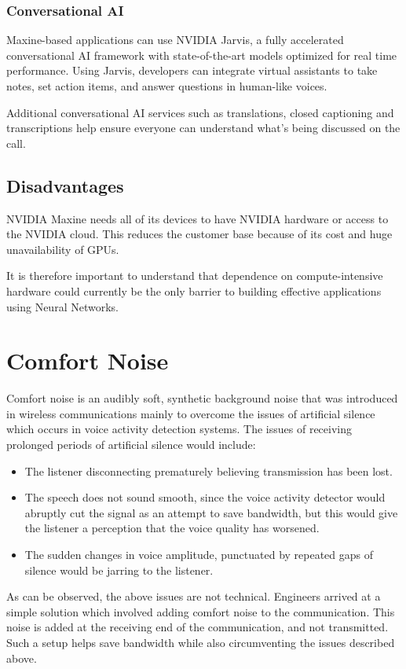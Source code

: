 \subsubsection{Conversational AI}
Maxine-based applications can use NVIDIA Jarvis, a fully accelerated conversational
AI framework with state-of-the-art models optimized for real time performance. Using Jarvis, 
developers can integrate virtual assistants to take notes, set action items, and answer questions 
in human-like voices.

Additional conversational AI services such as translations, closed captioning and transcriptions help 
ensure everyone can understand what’s being discussed on the call.

\subsection{Disadvantages}

NVIDIA Maxine needs all of its devices to have NVIDIA hardware or access to the NVIDIA cloud. 
This reduces the customer base because of its cost and huge unavailability of GPUs.

It is therefore important to understand that dependence on compute-intensive hardware could
currently be the only barrier to building effective applications using Neural Networks.

\section{Comfort Noise}

Comfort noise is an audibly soft, synthetic background noise that was introduced in wireless communications 
mainly to overcome the issues of artificial silence which occurs in voice activity detection systems.
The issues of receiving prolonged periods of artificial silence would include:

\begin{itemize}
    \item The listener disconnecting prematurely believing transmission has been lost.
    \item The speech does not sound smooth, since the voice activity detector would 
    abruptly cut the signal as an attempt to save bandwidth, but this would give the 
    listener a perception that the voice quality has worsened.
    \item The sudden changes in voice amplitude, punctuated by repeated gaps of silence 
    would be jarring to the listener.
\end{itemize}

As can be observed, the above issues are not technical. Engineers arrived at a simple solution which involved adding 
comfort noise to the communication. This noise is added at the receiving end of the communication, and not transmitted.~\cite{ComfortNoise}
Such a setup helps save bandwidth while also circumventing the issues described above.